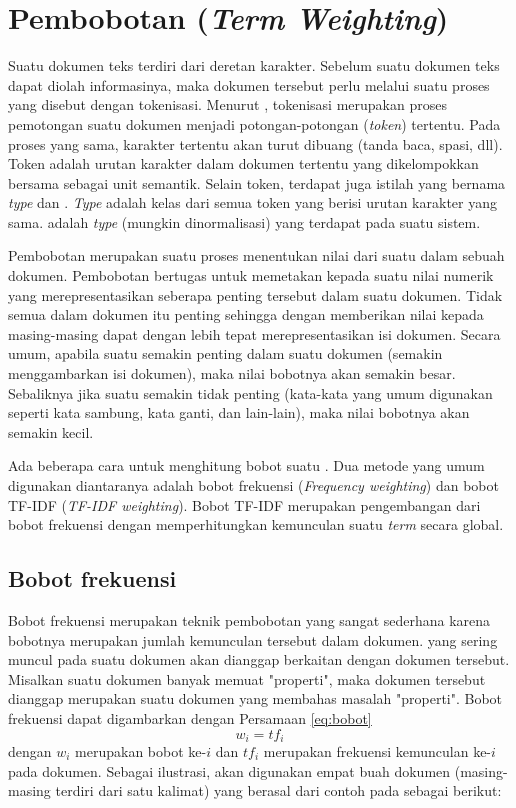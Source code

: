 \section{Pembobotan \Term (\textit{Term Weighting})}
\label{sec:termWeight}
Suatu dokumen teks terdiri dari deretan karakter. Sebelum suatu dokumen teks dapat diolah informasinya, maka dokumen tersebut perlu melalui suatu proses yang disebut dengan tokenisasi. Menurut \cite{schutze2008introduction}, tokenisasi merupakan proses pemotongan suatu dokumen menjadi potongan-potongan (\textit{token}) tertentu. Pada proses yang sama, karakter tertentu akan turut dibuang (tanda baca, spasi, dll). Token adalah urutan karakter dalam dokumen tertentu yang dikelompokkan bersama sebagai unit semantik. Selain token, terdapat juga istilah yang bernama \textit{type} dan \term. \textit{Type} adalah kelas dari semua token yang berisi urutan karakter yang sama. \Term adalah \textit{type} (mungkin dinormalisasi) yang terdapat pada suatu sistem.

Pembobotan \term merupakan suatu proses menentukan nilai dari suatu \term dalam sebuah dokumen. Pembobotan \term bertugas untuk memetakan \term kepada suatu nilai numerik yang merepresentasikan seberapa penting \term tersebut dalam suatu dokumen. Tidak semua \term dalam dokumen itu penting sehingga dengan memberikan nilai kepada masing-masing \term dapat dengan lebih tepat merepresentasikan isi dokumen. Secara umum, apabila suatu \term semakin penting dalam suatu dokumen (semakin menggambarkan isi dokumen), maka nilai bobotnya akan semakin besar. Sebaliknya jika suatu \term semakin tidak penting (kata-kata yang umum digunakan seperti kata sambung, kata ganti, dan lain-lain), maka nilai bobotnya akan semakin kecil.

Ada beberapa cara untuk menghitung bobot suatu \term. Dua metode yang umum digunakan diantaranya adalah bobot frekuensi (\textit{Frequency weighting}) dan bobot TF-IDF (\textit{TF-IDF weighting}). Bobot TF-IDF merupakan pengembangan dari bobot frekuensi dengan memperhitungkan kemunculan suatu \textit{term} secara global.

\subsection{Bobot frekuensi}
\label{sub:freq}
Bobot frekuensi merupakan teknik pembobotan yang sangat sederhana karena bobotnya merupakan jumlah kemunculan \term tersebut dalam dokumen. \Term yang sering muncul pada suatu dokumen akan dianggap berkaitan dengan dokumen tersebut. Misalkan suatu dokumen banyak memuat \term "properti", maka dokumen tersebut dianggap merupakan suatu dokumen yang membahas masalah "properti". Bobot frekuensi dapat digambarkan dengan Persamaan \ref{eq:bobot}
\begin{equation}
\label{eq:bobot}
w_i=tf_i
\end{equation}
dengan $w_i$ merupakan bobot \term ke-$i$ dan $tf_i$ merupakan frekuensi kemunculan \term ke-$i$ pada dokumen. Sebagai ilustrasi, akan digunakan empat buah dokumen (masing-masing terdiri dari satu kalimat) yang berasal dari contoh pada \cite{schutze2008introduction} sebagai berikut:

